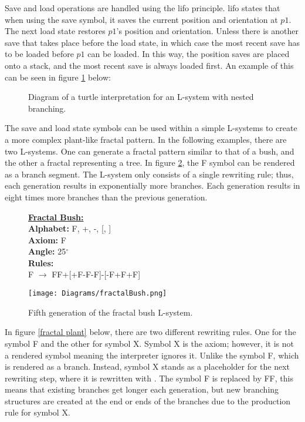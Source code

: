 \noindent
Save and load operations are handled using the \acrfull{lifo} principle. \acrshort{lifo} states that when using the save symbol, it saves the current position and orientation at $p1$. The next load state restores $p1$'s position and orientation. Unless there is another save that takes place before the load state, in which case the most recent save has to be loaded before $p1$ can be loaded. In this way, the position saves are placed onto a stack, and the most recent save is always loaded first. An example of this can be seen in figure \ref{branching 2} below:

\begin{figure}[htbp]
	{\centering
		\setlength{\fboxrule}{1pt}
		\vspace{7px}
		\caption{Diagram of a turtle interpretation for an L-system with nested branching.} \label{branching 2}
	}
\end{figure}
\FloatBarrier

\noindent
The save and load state symbols can be used within a simple L-systems to create a more complex plant-like fractal pattern. In the following examples, there are two L-systems. One can generate a fractal pattern similar to that of a bush, and the other a fractal representing a tree. In figure \ref{fractal bush}, the F symbol can be rendered as a branch segment. The L-system only consists of a single rewriting rule; thus, each generation results in exponentially more branches. Each generation results in eight times more branches than the previous generation. 

\begin{figure}[htbp]
	\raggedright
	\textbf{\underline{Fractal Bush:}} \\
	\textbf{Alphabet:} F, +, -, [, ] \\
	\textbf{Axiom:} F \\
	\textbf{Angle:} 25$^\circ$ \\
	\textbf{Rules:} \\
	F $\rightarrow$ FF+[+F-F-F]-[-F+F+F]\\
	\vspace{5mm}
	{\centering
		\vspace{7px}
		\texttt{[image: Diagrams/fractalBush.png]}
		\caption{Fifth generation of the fractal bush L-system.} \label{fractal bush}
	}
\end{figure}
\FloatBarrier

\noindent
In figure \ref{fractal plant} below, there are two different rewriting rules. One for the symbol F and the other for symbol X. Symbol X is the axiom; however, it is not a rendered symbol meaning the interpreter ignores it. Unlike the symbol F, which is rendered as a branch. Instead, symbol X stands as a placeholder for the next rewriting step, where it is rewritten with . The symbol F is replaced by FF, this means that existing branches get longer each generation, but new branching structures are created at the end  or ends of the branches due to the production rule for symbol X. 

